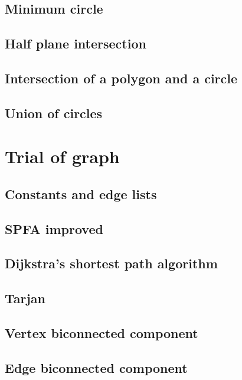 \documentclass[UTF8,a4paper]{report}
\begin{document}
		\section{Minimum circle}
			
		\section{Half plane intersection}
			
		\section{Intersection of a polygon and a circle}
			
		\section{Union of circles}	
			
	\chapter{Trial of graph}
		\section{Constants and edge lists}
			
		\section{SPFA improved}
			
		\section{Dijkstra's shortest path algorithm}
			
		\section{Tarjan}
			
		\section{Vertex biconnected component}
			
		\section{Edge biconnected component}
			
\end{document}

